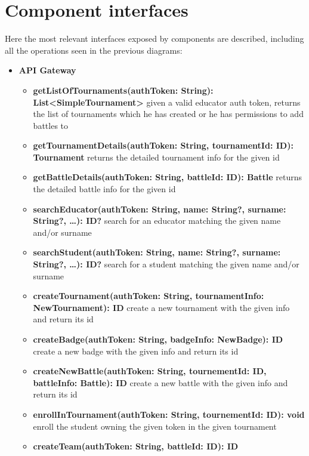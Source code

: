 \section{Component interfaces}
Here the most relevant interfaces exposed by components are described, including all the operations
seen in the previous diagrams:
\begin{itemize}
    \item \textbf{API Gateway}
          \begin{itemize}
              \item \textbf{getListOfTournaments(authToken: String): List<SimpleTournament>}
                    given a valid educator auth token, returns the list of tournaments which he has created
                    or he has permissions to add battles to
              \item \textbf{getTournamentDetails(authToken: String, tournamentId: ID): Tournament}
                    returns the detailed tournament info for the given id
              \item \textbf{getBattleDetails(authToken: String, battleId: ID): Battle}
                    returns the detailed battle info for the given id
              \item \textbf{searchEducator(authToken: String, name: String?, surname: String?, \ldots): ID?}
                    search for an educator matching the given name and/or surname
              \item \textbf{searchStudent(authToken: String, name: String?, surname: String?, \ldots): ID?}
                    search for a student matching the given name and/or surname
              \item \textbf{createTournament(authToken: String, tournamentInfo: NewTournament): ID}
                    create a new tournament with the given info and return its id
              \item \textbf{createBadge(authToken: String, badgeInfo: NewBadge): ID}
                    create a new badge with the given info and return its id
              \item \textbf{createNewBattle(authToken: String, tournementId: ID, battleInfo: Battle): ID}
                    create a new battle with the given info and return its id
              \item \textbf{enrollInTournament(authToken: String, tournementId: ID): void}
                    enroll the student owning the given token in the given tournament
              \item \textbf{createTeam(authToken: String, battleId: ID): ID}

\end{itemize}
\end{itemize}
